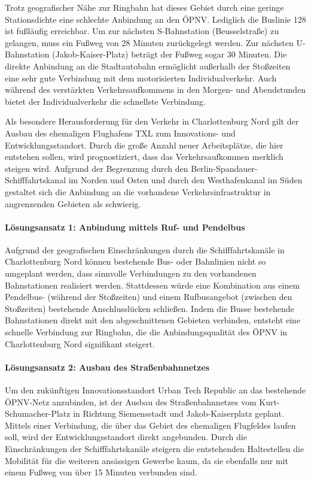 Trotz geografischer Nähe zur Ringbahn hat dieses Gebiet durch eine geringe Stationsdichte eine schlechte Anbindung an den ÖPNV. Lediglich die Buslinie 128 ist fußläufig erreichbar. Um zur nächsten S-Bahnstation (Beusselstraße) zu gelangen, muss ein Fußweg von 28 Minuten zurückgelegt werden. Zur nächsten U-Bahnstation (Jakob-Kaiser-Platz) beträgt der Fußweg sogar 30 Minuten. Die direkte Anbindung an die Stadtautobahn ermöglicht außerhalb der Stoßzeiten eine sehr gute Verbindung mit dem motorisierten Individualverkehr. Auch während des verstärkten Verkehrsaufkommens in den Morgen- und Abendstunden bietet der Individualverkehr die schnellste Verbindung.

Als besondere Herausforderung für den Verkehr in Charlottenburg Nord gilt der Ausbau des ehemaligen Flughafens TXL zum Innovations- und Entwicklungsstandort. Durch die große Anzahl neuer Arbeitsplätze, die hier entstehen sollen, wird prognostiziert, dass das Verkehrsaufkommen merklich steigen wird. Aufgrund der Begrenzung durch den Berlin-Spandauer-Schifffahrtskanal im Norden und Osten und durch den Westhafenkanal im Süden gestaltet sich die Anbindung an die vorhandene Verkehrsinfrastruktur in angrenzenden Gebieten als schwierig.


\paragraph{Lösungsansatz 1: Anbindung mittels Ruf- und Pendelbus}
Aufgrund der geografischen Einschränkungen durch die Schifffahrtskanäle in Charlottenburg Nord können bestehende Bus- oder Bahnlinien nicht so umgeplant werden, dass sinnvolle Verbindungen zu den vorhandenen Bahnstationen realisiert werden. Stattdessen würde eine Kombination aus einem Pendelbus- (während der Stoßzeiten) und einem Rufbusangebot (zwischen den Stoßzeiten) bestehende Anschlusslücken schließen. Indem die Busse bestehende Bahnstationen direkt mit den abgeschnittenen Gebieten verbinden, entsteht eine schnelle Verbindung zur Ringbahn, die die Anbindungsqualität des ÖPNV in Charlottenburg Nord signifikant steigert.

\paragraph{Lösungsansatz 2: Ausbau des Straßenbahnnetzes}
Um den zukünftigen Innovationsstandort Urban Tech Republic an das bestehende ÖPNV-Netz anzubinden, ist der Ausbau des Straßenbahnnetzes vom Kurt-Schumacher-Platz in Richtung Siemensstadt und Jakob-Kaiserplatz geplant. Mittels einer Verbindung, die über das Gebiet des ehemaligen Flugfeldes laufen soll, wird der Entwicklungsstandort direkt angebunden. Durch die Einschränkungen der Schifffahrtskanäle steigern die entstehenden Haltestellen die Mobilität für die weiteren ansässigen Gewerbe kaum, da sie ebenfalls nur mit einem Fußweg von über 15 Minuten verbunden sind.









